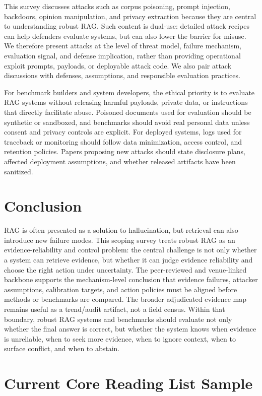 \documentclass[11pt]{article}
\begin{document}
This survey discusses attacks such as corpus poisoning, prompt injection, backdoors, opinion manipulation, and privacy extraction because they are central to understanding robust RAG. Such content is dual-use: detailed attack recipes can help defenders evaluate systems, but can also lower the barrier for misuse. We therefore present attacks at the level of threat model, failure mechanism, evaluation signal, and defense implication, rather than providing operational exploit prompts, payloads, or deployable attack code. We also pair attack discussions with defenses, assumptions, and responsible evaluation practices.

For benchmark builders and system developers, the ethical priority is to evaluate RAG systems without releasing harmful payloads, private data, or instructions that directly facilitate abuse. Poisoned documents used for evaluation should be synthetic or sandboxed, and benchmarks should avoid real personal data unless consent and privacy controls are explicit. For deployed systems, logs used for traceback or monitoring should follow data minimization, access control, and retention policies. Papers proposing new attacks should state disclosure plans, affected deployment assumptions, and whether released artifacts have been sanitized.

\section{Conclusion}

RAG is often presented as a solution to hallucination, but retrieval can also introduce new failure modes. This scoping survey treats robust RAG as an evidence-reliability and control problem: the central challenge is not only whether a system can retrieve evidence, but whether it can judge evidence reliability and choose the right action under uncertainty. The peer-reviewed and venue-linked backbone supports the mechanism-level conclusion that evidence failures, attacker assumptions, calibration targets, and action policies must be aligned before methods or benchmarks are compared. The broader adjudicated evidence map remains useful as a trend/audit artifact, not a field census. Within that boundary, robust RAG systems and benchmarks should evaluate not only whether the final answer is correct, but whether the system knows when evidence is unreliable, when to seek more evidence, when to ignore context, when to surface conflict, and when to abstain.

\appendix
\section{Current Core Reading List Sample}

\end{document}
